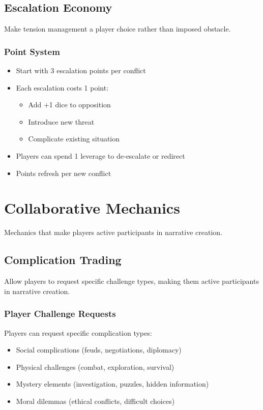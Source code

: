 \subsection{Escalation Economy}

Make tension management a player choice rather than imposed obstacle.

\subsubsection{Point System}

\begin{itemize}
\item Start with 3 escalation points per conflict
\item Each escalation costs 1 point:
  \begin{itemize}
  \item Add +1 dice to opposition
  \item Introduce new threat
  \item Complicate existing situation
  \end{itemize}
\item Players can spend 1 leverage to de-escalate or redirect
\item Points refresh per new conflict
\end{itemize}

\section{Collaborative Mechanics}

Mechanics that make players active participants in narrative creation.

\subsection{Complication Trading}

Allow players to request specific challenge types, making them active participants in narrative creation.

\subsubsection{Player Challenge Requests}

Players can request specific complication types:
\begin{itemize}
\item Social complications (feuds, negotiations, diplomacy)
\item Physical challenges (combat, exploration, survival)
\item Mystery elements (investigation, puzzles, hidden information)
\item Moral dilemmas (ethical conflicts, difficult choices)
\end{itemize}

